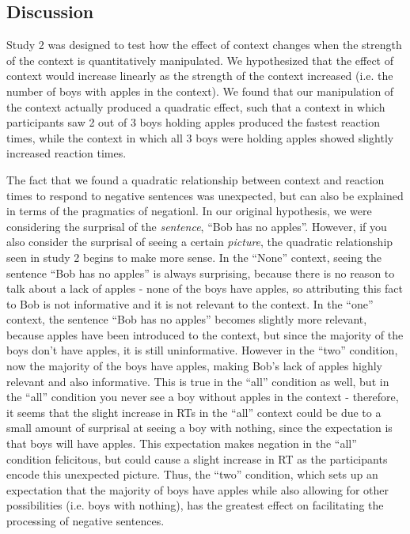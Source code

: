 \documentclass[10pt,letterpaper]{article}
\begin{document}
\subsection{Discussion}
Study 2 was designed to test how the effect of context changes when the strength of the context is quantitatively manipulated.  We hypothesized that the effect of context would increase linearly as the strength of the context increased (i.e. the number of boys with apples in the context).  We found that our manipulation of the context actually produced a quadratic effect, such that a context in which participants saw 2 out of 3 boys holding apples produced the fastest reaction times, while the context in which all 3 boys were holding apples showed slightly increased reaction times.  

The fact that we found a quadratic relationship between context and reaction times to respond to negative sentences was unexpected, but can also be explained in terms of the pragmatics of negationl.  In our original hypothesis, we were considering the surprisal of the \emph{sentence}, ``Bob has no apples''.  However, if you also consider the surprisal of seeing a certain \emph{picture}, the quadratic relationship seen in study 2 begins to make more sense.  In the ``None'' context, seeing the sentence ``Bob has no apples'' is always surprising, because there is no reason to talk about a lack of apples - none of the boys have apples, so attributing this fact to Bob is not informative and it is not relevant to the context.  In the ``one'' context, the sentence ``Bob has no apples'' becomes slightly more relevant, because apples have been introduced to the context, but since the majority of the boys don't have apples, it is still uninformative.  However in the ``two'' condition, now the majority of the boys have apples, making Bob's lack of apples highly relevant and also informative.  This is true in the ``all'' condition as well, but in the ``all'' condition you never see a boy without apples in the context - therefore, it seems that the slight increase in RTs in the ``all'' context could be due to a small amount of surprisal at seeing a boy with nothing, since the expectation is that boys will have apples.  This expectation makes negation in the ``all'' condition felicitous, but could cause a slight increase in RT as the participants encode this unexpected picture.  Thus, the ``two'' condition, which sets up an expectation that the majority of boys have apples while also allowing for other possibilities (i.e. boys with nothing), has the greatest effect on facilitating the processing of negative sentences. 
\end{document}
